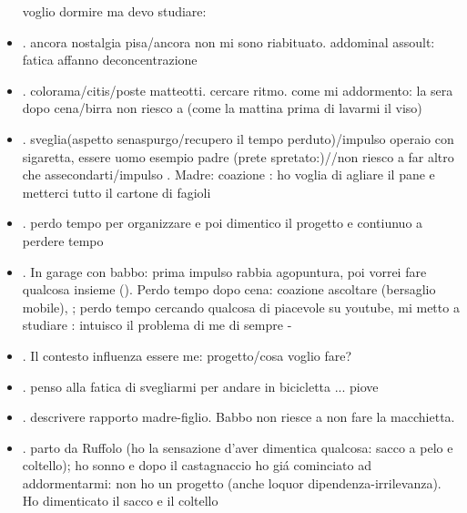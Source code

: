 \begin{itemize}
voglio dormire ma devo studiare: 
\item {}.
ancora nostalgia pisa/ancora non mi sono riabituato. addominal assoult: fatica affanno deconcentrazione 
\item {}.
colorama/citis/poste matteotti. cercare ritmo.
come mi addormento: la sera dopo cena/birra non riesco a  (come la mattina prima di lavarmi il viso)
\item {}.
sveglia(aspetto senaspurgo/recupero il tempo perduto)/impulso operaio con sigaretta, essere uomo esempio padre (prete spretato:)//non riesco a far altro che assecondarti/impulso .
Madre: coazione 
: ho voglia di agliare il pane e metterci tutto il cartone di fagioli
\item {}.
perdo tempo per organizzare e poi dimentico il progetto e contiunuo a perdere tempo
\item {}.
In garage con babbo: prima impulso rabbia agopuntura, poi vorrei fare qualcosa insieme ().
Perdo tempo dopo cena: coazione ascoltare (bersaglio mobile), ; perdo tempo cercando qualcosa di piacevole su youtube, mi metto a studiare : intuisco il problema di me di sempre - 
\item {}.
Il contesto influenza essere me: progetto/cosa voglio fare?
\item {}.
penso alla fatica di svegliarmi per andare in bicicletta ... piove
\item {}.
descrivere rapporto madre-figlio.
Babbo non riesce a non fare la macchietta.
\item {}.
parto da Ruffolo (ho la sensazione d'aver dimentica qualcosa: sacco a pelo e coltello); ho sonno e dopo il castagnaccio ho gi\'a cominciato ad addormentarmi: non ho un progetto (anche loquor dipendenza-irrilevanza). Ho dimenticato il sacco e il coltello

\end{itemize}
